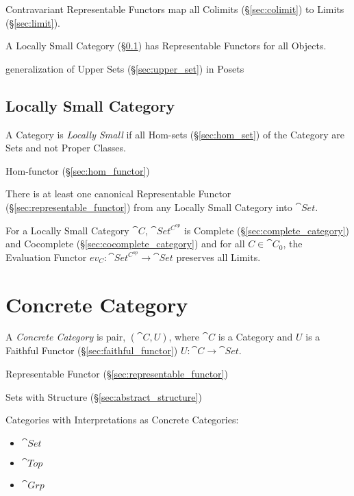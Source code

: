 Contravariant Representable Functors map all Colimits
(\S\ref{sec:colimit}) to Limits (\S\ref{sec:limit}).

A Locally Small Category (\S\ref{sec:locally_small}) has Representable
Functors for all Objects.

generalization of Upper Sets (\S\ref{sec:upper_set}) in Posets



\subsection{Locally Small Category}\label{sec:locally_small}

A Category is \emph{Locally Small} if all Hom-sets
(\S\ref{sec:hom_set}) of the Category are Sets and not Proper Classes.

Hom-functor (\S\ref{sec:hom_functor})

There is at least one canonical Representable Functor
(\S\ref{sec:representable_functor}) from any Locally Small Category
into $\cat{Set}$.

For a Locally Small Category $\cat{C}$, $\cat{Set^{C^{op}}}$ is
Complete (\S\ref{sec:complete_category}) and Cocomplete
(\S\ref{sec:cocomplete_category}) and for all $C \in \cat{C}_0$,
the Evaluation Functor $ev_C : \cat{Set^{C^{op}}} \rightarrow
\cat{Set}$ preserves all Limits. \cite{awodey06}



\section{Concrete Category}\label{sec:concrete_category}

A \emph{Concrete Category} is pair, $(\cat{C},U)$, where $\cat{C}$ is
a Category and $U$ is a Faithful Functor
(\S\ref{sec:faithful_functor}) $U : \cat{C} \rightarrow \cat{Set}$.

Representable Functor (\S\ref{sec:representable_functor})

Sets with Structure (\S\ref{sec:abstract_structure})

Categories with Interpretations as Concrete Categories:
\begin{itemize}
  \item $\cat{Set}$
  \item $\cat{Top}$
  \item $\cat{Grp}$
\end{itemize}

